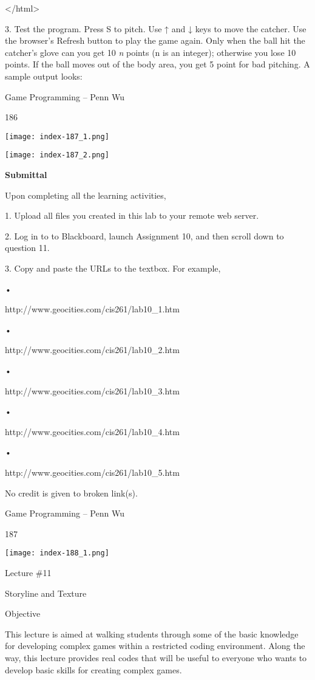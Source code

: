 \documentclass[
]{article}
\begin{document}
\textless/html\textgreater{}

3. Test the program. Press S to pitch. Use ↑ and ↓ keys to move the
catcher. Use the browser's Refresh button to play the game again. Only
when the ball hit the catcher's glove can you get 10 \emph{n} points (n
is an integer); otherwise you lose 10 points. If the ball moves out of
the body area, you get 5 point for bad pitching. A sample output looks:

Game Programming -- Penn Wu

186

\protect\hypertarget{index_split_011.htmlux5cux23p187}{}{}\texttt{[image: index-187\_1.png]}

\texttt{[image: index-187\_2.png]}

\textbf{Submittal}

Upon completing all the learning activities,

1. Upload all files you created in this lab to your remote web server.

2. Log in to to Blackboard, launch Assignment 10, and then scroll down
to question 11.

3. Copy and paste the URLs to the textbox. For example,

•

http://www.geocities.com/cis261/lab10\_1.htm

•

http://www.geocities.com/cis261/lab10\_2.htm

•

http://www.geocities.com/cis261/lab10\_3.htm

•

http://www.geocities.com/cis261/lab10\_4.htm

•

http://www.geocities.com/cis261/lab10\_5.htm

No credit is given to broken link(s).

Game Programming -- Penn Wu

187

\protect\hypertarget{index_split_011.htmlux5cux23p188}{}{}\texttt{[image: index-188\_1.png]}

Lecture \#11

Storyline and Texture

Objective

This lecture is aimed at walking students through some of the basic
knowledge for developing complex games within a restricted coding
environment. Along the way, this lecture provides real codes that will
be useful to everyone who wants to develop basic skills for creating
complex games.
\end{document}
